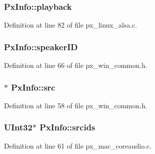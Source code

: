 \subsubsection[{\texorpdfstring{playback}{playback}}]{ Px\+Info\+::playback}\hypertarget{struct_px_info_a7a848184df827bee1730b9538a496d96}{}\label{struct_px_info_a7a848184df827bee1730b9538a496d96}


Definition at line 82 of file px\+\_\+linux\+\_\+alsa.\+c.

\subsubsection[{\texorpdfstring{speaker\+ID}{speakerID}}]{ Px\+Info\+::speaker\+ID}\hypertarget{struct_px_info_ab8959e1e0fc65d17a7e0a75b4d5898f8}{}\label{struct_px_info_ab8959e1e0fc65d17a7e0a75b4d5898f8}


Definition at line 66 of file px\+\_\+win\+\_\+common.\+h.

\subsubsection[{\texorpdfstring{src}{src}}]{$\ast$ Px\+Info\+::src}\hypertarget{struct_px_info_a9c5a80bbd47331ebf87847297e7b3ef0}{}\label{struct_px_info_a9c5a80bbd47331ebf87847297e7b3ef0}


Definition at line 58 of file px\+\_\+win\+\_\+common.\+h.

\subsubsection[{\texorpdfstring{srcids}{srcids}}]{\setlength{\rightskip}{0pt plus 5cm}U\+Int32$\ast$ Px\+Info\+::srcids}\hypertarget{struct_px_info_a57da3d98a893d2211268b3e75f7289c3}{}\label{struct_px_info_a57da3d98a893d2211268b3e75f7289c3}


Definition at line 61 of file px\+\_\+mac\+\_\+coreaudio.\+c.

